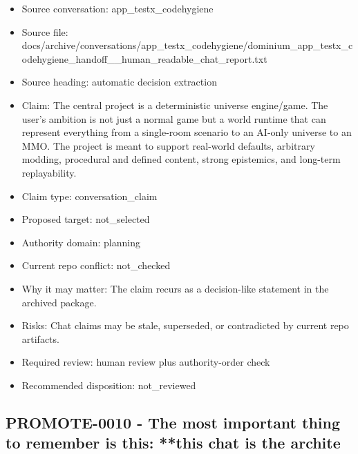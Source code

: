 \documentclass[11pt,a4paper]{report}
\begin{document}
\begin{itemize}
\item Source conversation: app\_testx\_codehygiene
\item Source file: docs/archive/conversations/app\_testx\_codehygiene/dominium\_app\_testx\_codehygiene\_handoff\_\_human\_readable\_chat\_report.txt
\item Source heading: automatic decision extraction
\item Claim: The central project is a deterministic universe engine/game. The user's ambition is not just a normal game but a world runtime that can represent everything from a single-room scenario to an AI-only universe to an MMO. The project is meant to support real-world defaults, arbitrary modding, procedural and defined content, strong epistemics, and long-term replayability.
\item Claim type: conversation\_claim
\item Proposed target: not\_selected
\item Authority domain: planning
\item Current repo conflict: not\_checked
\item Why it may matter: The claim recurs as a decision-like statement in the archived package.
\item Risks: Chat claims may be stale, superseded, or contradicted by current repo artifacts.
\item Required review: human review plus authority-order check
\item Recommended disposition: not\_reviewed
\end{itemize}

\subsection{PROMOTE-0010 - The most important thing to remember is this: **this chat is the archite}
\end{document}
